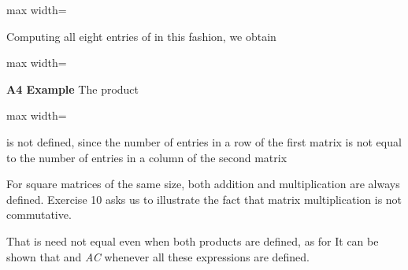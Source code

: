 \documentclass[11pt,oneside]{article}
\begin{document}
\begin{BookBody}
\begin{center}\begin{adjustbox}{max width=\linewidth}\end{adjustbox}\end{center}

\noindent Computing all eight entries of  in this fashion, we obtain

\begin{center}\begin{adjustbox}{max width=\linewidth}\end{adjustbox}\end{center} \BookEnd{\blacktriangle}

\noindent \textbf{A4 Example} The product

\begin{center}\begin{adjustbox}{max width=\linewidth}\end{adjustbox}\end{center}

\noindent is not defined, since the number of entries in a row of the first matrix is not equal to the number of entries in a column of the second matrix\BookEnd{\blacktriangle}

For square matrices of the same size, both addition and multiplication are always defined. Exercise 10 asks us to illustrate the fact that matrix multiplication is not commutative.

That is need not equal  even when both products are defined, as for   It can be shown that  and  \textit{AC} whenever all these expressions are defined.


\end{BookBody}
\end{document}
